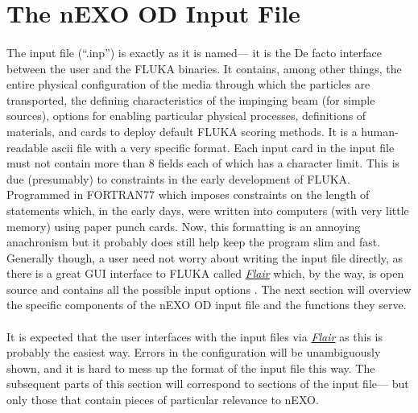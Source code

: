 \section{The nEXO OD Input File}
\paragraph{}
The input file (``.inp'') is exactly as it is named— it is the De facto interface between the user and the FLUKA binaries. It contains, among other things, the entire physical configuration of the media through which the particles are transported, the defining characteristics of the impinging beam (for simple sources), options for enabling particular physical processes, definitions of materials, and cards to deploy default FLUKA scoring methods. It is a human-readable ascii file with a very specific format. Each input card in the input file must not contain more than 8 fields each of which has a character limit. This is due (presumably) to constraints in the early development of FLUKA. Programmed in FORTRAN77 which imposes constraints on the length of statements which, in the early days, were written into computers (with very little memory) using paper punch cards. Now, this formatting is an annoying anachronism but it probably does still help keep the program slim and fast. Generally though, a user need not worry about writing the input file directly, as there is a great GUI interface to FLUKA called \href{https://fluka.cern/documentation/examples/flair}{\textit{Flair}} which, by the way, is open source and contains all the possible input options \cite{Flair}. The next section will overview the specific components of the nEXO OD input file and the functions they serve. 

\paragraph{}
It is expected that the user interfaces with the input files via \href{https://fluka.cern/documentation/examples/flair}{\textit{Flair}} as this is probably the easiest way. Errors in the configuration will be unambiguously shown, and it is hard to mess up the format of the input file this way. The subsequent parts of this section will correspond to sections of the input file— but only those that contain pieces of particular relevance to nEXO.